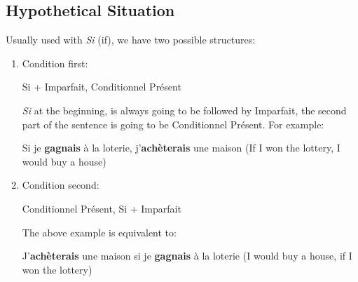 \documentclass{book}
\begin{document}
\subsection{Hypothetical Situation}
Usually used with \textit{Si} (if), we have two possible structures:
\begin{enumerate}
    \item Condition first:
        \begin{center}
            Si + Imparfait, Conditionnel Présent
        \end{center}
        \textit{Si} at the beginning, is always going to be followed by Imparfait, the second part of the sentence is going to be Conditionnel Présent. For example:
        \begin{center}
            Si je \textbf{gagnais} à la loterie, j'\textbf{achèterais} une maison (If I won the lottery, I would buy a house) 
        \end{center}
    \item Condition second:
        \begin{center}
            Conditionnel Présent, Si + Imparfait
        \end{center}
        The above example is equivalent to:
        \begin{center}
            J'\textbf{achèterais} une maison si je \textbf{gagnais} à la loterie (I would buy a house, if I won the lottery)
        \end{center}
\end{enumerate}
\end{document}
